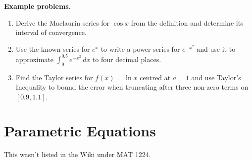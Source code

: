 \textbf{Example problems.}

\begin{enumerate}
    \item Derive the Maclaurin series for $\cos x$ from the definition and determine its interval of convergence.
    \item Use the known series for $e^x$ to write a power series for $e^{-x^2}$ and use it to approximate $\int_0^{0.5}e^{-x^2}\,dx$ to four decimal places.
    \item Find the Taylor series for $f(x) = \ln x$ centred at $a=1$ and use Taylor's Inequality to bound the error when truncating after three non-zero terms on $[0.9, 1.1]$.
\end{enumerate}

\section{Parametric Equations}
\label{sec:parametric-equations}

This wasn't listed in the Wiki under MAT 1224.
